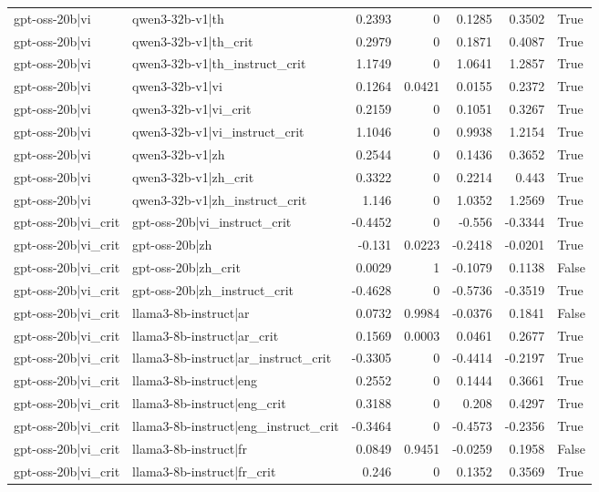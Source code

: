 \begin{table}
\begin{tabular}{l l r r r r l}
gpt-oss-20b|vi & qwen3-32b-v1|th & 0.2393 & 0 & 0.1285 & 0.3502 & True \\
gpt-oss-20b|vi & qwen3-32b-v1|th_crit & 0.2979 & 0 & 0.1871 & 0.4087 & True \\
gpt-oss-20b|vi & qwen3-32b-v1|th_instruct_crit & 1.1749 & 0 & 1.0641 & 1.2857 & True \\
gpt-oss-20b|vi & qwen3-32b-v1|vi & 0.1264 & 0.0421 & 0.0155 & 0.2372 & True \\
gpt-oss-20b|vi & qwen3-32b-v1|vi_crit & 0.2159 & 0 & 0.1051 & 0.3267 & True \\
gpt-oss-20b|vi & qwen3-32b-v1|vi_instruct_crit & 1.1046 & 0 & 0.9938 & 1.2154 & True \\
gpt-oss-20b|vi & qwen3-32b-v1|zh & 0.2544 & 0 & 0.1436 & 0.3652 & True \\
gpt-oss-20b|vi & qwen3-32b-v1|zh_crit & 0.3322 & 0 & 0.2214 & 0.443 & True \\
gpt-oss-20b|vi & qwen3-32b-v1|zh_instruct_crit & 1.146 & 0 & 1.0352 & 1.2569 & True \\
gpt-oss-20b|vi_crit & gpt-oss-20b|vi_instruct_crit & -0.4452 & 0 & -0.556 & -0.3344 & True \\
gpt-oss-20b|vi_crit & gpt-oss-20b|zh & -0.131 & 0.0223 & -0.2418 & -0.0201 & True \\
gpt-oss-20b|vi_crit & gpt-oss-20b|zh_crit & 0.0029 & 1 & -0.1079 & 0.1138 & False \\
gpt-oss-20b|vi_crit & gpt-oss-20b|zh_instruct_crit & -0.4628 & 0 & -0.5736 & -0.3519 & True \\
gpt-oss-20b|vi_crit & llama3-8b-instruct|ar & 0.0732 & 0.9984 & -0.0376 & 0.1841 & False \\
gpt-oss-20b|vi_crit & llama3-8b-instruct|ar_crit & 0.1569 & 0.0003 & 0.0461 & 0.2677 & True \\
gpt-oss-20b|vi_crit & llama3-8b-instruct|ar_instruct_crit & -0.3305 & 0 & -0.4414 & -0.2197 & True \\
gpt-oss-20b|vi_crit & llama3-8b-instruct|eng & 0.2552 & 0 & 0.1444 & 0.3661 & True \\
gpt-oss-20b|vi_crit & llama3-8b-instruct|eng_crit & 0.3188 & 0 & 0.208 & 0.4297 & True \\
gpt-oss-20b|vi_crit & llama3-8b-instruct|eng_instruct_crit & -0.3464 & 0 & -0.4573 & -0.2356 & True \\
gpt-oss-20b|vi_crit & llama3-8b-instruct|fr & 0.0849 & 0.9451 & -0.0259 & 0.1958 & False \\
gpt-oss-20b|vi_crit & llama3-8b-instruct|fr_crit & 0.246 & 0 & 0.1352 & 0.3569 & True \\

\end{tabular}
\end{table}
